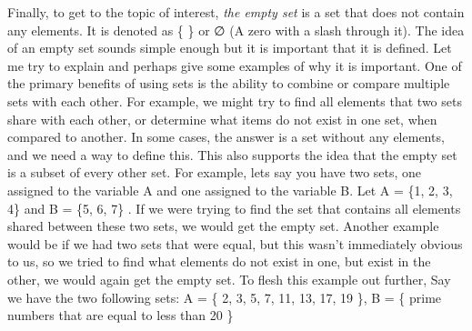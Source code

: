 \documentclass[12pt]{article}
\begin{document}
\begin{flushleft}
Finally, to get to the topic of interest, \textit{the empty set} is a set that does not contain any elements. It is denoted as \{ \} or ∅ (A zero with a slash through it). The idea of an empty set sounds simple enough but it is important that it is defined. Let me try to explain and perhaps give some examples of why it is important. One of the primary benefits of using sets is the ability to combine or compare multiple sets with each other. For example, we might try to find all elements that two sets share with each other, or determine what items do not exist in one set, when compared to another. In some cases, the answer is a set without any elements, and we need a way to define this. This also supports the idea that the empty set is a subset of every other set. For example, lets say you have two sets, one assigned to the variable A and one assigned to the variable B. Let A = \{1, 2, 3, 4\} and B = \{5, 6, 7\} . If we were trying to find the set that contains all elements shared between these two sets, we would get the empty set. Another example would be if we had two sets that were equal, but this wasn't immediately obvious to us, so we tried to find what elements do not exist in one, but exist in the other, we would again get the empty set. To flesh this example out further, Say we have the two following sets: A = \{ 2, 3, 5, 7, 11, 13, 17, 19 \}, B = \{ prime numbers that are equal to less than 20 \}
\end{flushleft}
\end{document}
